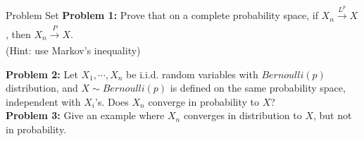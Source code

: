 \documentclass [aspectratio=169]{beamer}
\begin{document}
\begin{frame}{Problem Set}
    \textbf{Problem 1:}  Prove that on a complete probability space, if $X_n  \xrightarrow[]{L^p} X$, then $X_n \xrightarrow[]{P} X$. \\
    (Hint: use Markov's inequality)\\
    \vspace{0.1in}
    
     \textbf{Problem 2:} Let $X_1, \cdots, X_n$ be i.i.d. random variables with $Bernoulli(p)$ distribution, and  $X \sim Bernoulli(p)$ is defined on the same probability space, independent with $X_i$'s. Does $X_n$ converge in probability to $X$? 
    \vspace{0.1in}\\
    
    \textbf{Problem 3:} Give an example where $X_n$ converges in distribution to $X$, but not in probability.
    \vspace{0.1in}\\
\end{frame}
\end{document}
